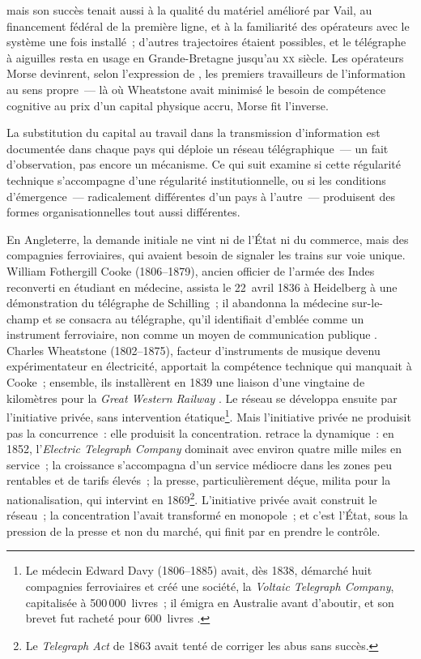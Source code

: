mais son succès tenait aussi à la qualité du matériel amélioré par Vail, au financement fédéral de la première ligne, et à la familiarité des opérateurs avec le système une fois installé~; d'autres trajectoires étaient possibles, et le télégraphe à aiguilles resta en usage en Grande-Bretagne jusqu'au \textsc{xx}\ieme{} siècle. Les opérateurs Morse devinrent, selon l'expression de \textcite{gabler_american_1988}, les premiers \og travailleurs de l'information\fg{} au sens propre~--- là où Wheatstone avait minimisé le besoin de compétence cognitive au prix d'un capital physique accru, %
Morse fit l'inverse.

%
La substitution du capital au travail dans la transmission d'information est documentée dans chaque pays qui déploie un réseau télégraphique~--- un fait d'observation, pas encore un mécanisme. Ce qui suit examine si cette régularité technique s'accompagne d'une régularité institutionnelle, ou si les conditions d'émergence~--- radicalement différentes d'un pays à l'autre~--- produisent des formes organisationnelles tout aussi différentes.

%
En Angleterre, la demande initiale ne vint ni de l'État ni du commerce, mais des compagnies ferroviaires, qui avaient besoin de signaler les trains sur voie unique. William Fothergill Cooke (1806--1879), ancien officier de l'armée des Indes reconverti en étudiant en médecine, assista le 22~avril 1836 à Heidelberg à une démonstration du télégraphe de Schilling~; il abandonna la médecine sur-le-champ et se consacra au télégraphe, qu'il identifiait d'emblée comme un instrument ferroviaire, non comme un moyen de communication publique \parencite{kooij_telegraph_2015, hubbard_cooke_1965}. Charles Wheatstone (1802--1875), facteur d'instruments de musique devenu expérimentateur en électricité, apportait la compétence technique qui manquait à Cooke~; ensemble, ils installèrent en 1839 une liaison d'une vingtaine de kilomètres pour la \emph{Great Western Railway} \parencite{hubbard_cooke_1965}. Le réseau se développa ensuite par l'initiative privée, sans intervention étatique\footnote{Le médecin Edward Davy (1806--1885) avait, dès 1838, démarché huit compagnies ferroviaires et créé une société, la \emph{Voltaic Telegraph Company}, capitalisée à 500\,000~livres~; il émigra en Australie avant d'aboutir, et son brevet fut racheté pour 600~livres \parencite{kooij_telegraph_2015}.}. Mais l'initiative privée ne produisit pas la concurrence~: elle produisit la concentration. \textcite{kieve_electric_1973} retrace la dynamique~: en 1852, l'\emph{Electric Telegraph Company} dominait avec environ quatre mille miles en service~; la croissance s'accompagna d'un service médiocre dans les zones peu rentables et de tarifs élevés~; la presse, particulièrement déçue, milita pour la nationalisation, qui intervint en 1869\footnote{Le \emph{Telegraph Act} de 1863 avait tenté de corriger les abus sans succès.}. L'initiative privée avait construit le réseau~; la concentration l'avait transformé en monopole~; et c'est l'État, sous la pression de la presse et non du marché, qui finit par en prendre le contrôle.

